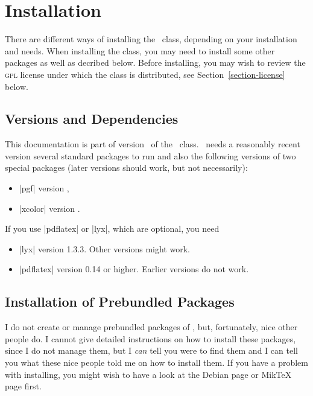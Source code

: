 %

\section{Installation}

\label{section-installation}


There are different ways of installing the \beamer\ class, depending
on your installation and needs. When installing the class, you may
need to install some other packages as well as decribed below. Before
installing, you may wish to review the \textsc{gpl} license under
which the class is distributed, see Section~\ref{section-license} below.



\subsection{Versions and Dependencies}

This documentation is part of version \version\ of the \beamer\
class. \beamer\ needs a reasonably recent version several standard
packages to run and also the following versions of two special
packages (later versions should work, but not necessarily): 
\begin{itemize}
\item
  |pgf| version \pgfversion,
\item
  |xcolor| version \xcolorversion.
\end{itemize}

If you use |pdflatex| or |lyx|, which are optional, you need
\begin{itemize}
\item
  |lyx| version 1.3.3. Other versions might work.
\item
  |pdflatex| version 0.14 or higher. Earlier versions do not work. 
\end{itemize}



\subsection{Installation of Prebundled Packages}

I do not create or manage prebundled packages of \beamer, but,
fortunately, nice other people do. I cannot give detailed instructions
on how to install these packages, since I do not manage them, but I
\emph{can} tell you were to find them and I can tell you what these
nice people told me on how to install them. If you have a problem with
installing, you might wish to have a look at the Debian page or MikTeX
page first.


